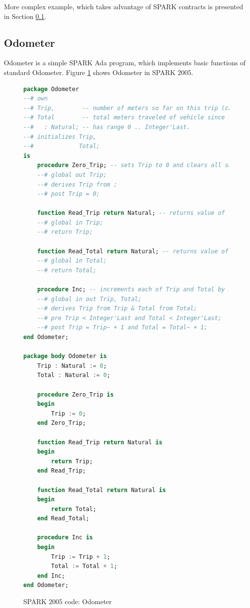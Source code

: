 More complex example, which takes advantage of SPARK contracts is presented in Section \ref{pcapumpimpl:beagleboard:odometer}.

\subsection{Odometer}
\label{pcapumpimpl:beagleboard:odometer}

Odometer is a simple SPARK Ada program, which implements basic functions of standard Odometer. Figure \ref{listing:Odometer2005} shows Odometer in SPARK 2005.

\begin{figure} %
\singlespacing
\begin{lstlisting}[language=ada, frame=single, gobble=0]
package Odometer
--# own
--# Trip,        -- number of meters so far on this trip (can be reset to 0).
--# Total        -- total meters traveled of vehicle since the last factory-reset.
--#   : Natural; -- has range 0 .. Integer'Last.
--# initializes Trip,
--#             Total;
is
    procedure Zero_Trip; -- sets Trip to 0 and clears all saved Trip marks.
    --# global out Trip;
    --# derives Trip from ;
    --# post Trip = 0;
    
    function Read_Trip return Natural; -- returns value of Trip.
    --# global in Trip;
    --# return Trip;
    
    function Read_Total return Natural; -- returns value of Total
    --# global in Total;
    --# return Total;
    
    procedure Inc; -- increments each of Trip and Total by 1.
    --# global in out Trip, Total;
    --# derives Trip from Trip & Total from Total;
    --# pre Trip < Integer'Last and Total < Integer'Last;
    --# post Trip = Trip~ + 1 and Total = Total~ + 1;	    
end Odometer;

package body Odometer is
    Trip : Natural := 0;
    Total : Natural := 0;
    
    procedure Zero_Trip is
    begin
        Trip := 0;
    end Zero_Trip;
    
    function Read_Trip return Natural is
    begin
        return Trip;
    end Read_Trip;
    
    function Read_Total return Natural is
    begin
        return Total;
    end Read_Total;
    
    procedure Inc is
    begin
        Trip := Trip + 1;
        Total := Total + 1;
    end Inc;
end Odometer;
\end{lstlisting} 
\doublespacing
\caption{SPARK 2005 code: Odometer}
\label{listing:Odometer2005}
\end{figure}

